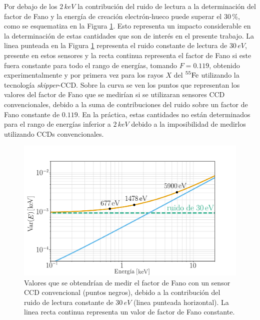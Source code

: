 Por debajo de los $2\,\si{keV}$ la contribución del ruido de lectura a la determinación del factor de Fano y la energía de creación electrón-hueco puede superar el $30\,\%$, como se esquematiza en la Figura \ref{fig:Fano_y_ruido}. Esto representa un impacto considerable en la determinación de estas cantidades que son de interés en el presente trabajo. La linea punteada en la Figura \ref{fig:Fano_y_ruido} representa el ruido constante de lectura de $30\,\si{eV}$, presente en estos sensores y la recta continua representa el factor de Fano si este fuera constante para todo el rango de energías, tomando $F=0.119$, obtenido experimentalmente y por primera vez para los rayos $X$ del $\prescript{55}{}{\mbox{Fe}}$ utilizando la tecnología \textit{skipper}-CCD\cite{Rodrigues}. 
Sobre la curva se ven los puntos que representan los valores del factor de Fano que se medirían si se utilizaran sensores CCD convencionales, debido a la suma de contribuciones del ruido sobre un factor de Fano constante de $0.119$. En la práctica, estas cantidades no están determinados para el rango de energías inferior a $2\,\si{keV}$ debido a la imposibilidad de medirlos utilizando CCDs convencionales.
\begin{figure}[h]
    \centering
        \includegraphics[scale=0.5]{Figs/fano_y_ruido.pdf}
    \caption{Valores que se obtendrían de medir el factor de Fano con un sensor CCD convencional (puntos negros), debido a la contribución del ruido de lectura constante de $30\,\si{eV}$ (linea punteada horizontal). La linea recta continua representa un valor de factor de Fano constante.}
    \label{fig:Fano_y_ruido}
\end{figure}

